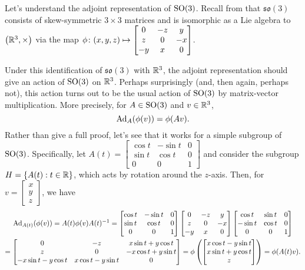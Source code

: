 \begin{example}\label{ex:adjoint action of so3}
	Let's understand the adjoint representation of $\operatorname{SO}(3)$. Recall from  that $\mathfrak{so}(3)$ consists of skew-symmetric $3 \times 3$ matrices and is isomorphic as a Lie algebra to $\left(\mathbb{R}^3, \times \right)$ via the map $\phi \colon\thinspace\! (x,y,z) \mapsto \begin{bmatrix} 0 & -z & y \\ z & 0 & -x \\ -y & x & 0 \end{bmatrix}$.
	
	Under this identification of $\mathfrak{so}(3)$ with $\mathbb{R}^3$, the adjoint representation should give an action of $\operatorname{SO}(3)$ on $\mathbb{R}^3$. Perhaps surprisingly (and, then again, perhaps not), this action turns out to be the usual action of $\operatorname{SO}(3)$ by matrix-vector multiplication. More precisely, for $A \in \operatorname{SO}(3)$ and $v \in \mathbb{R}^3$,
	\[
		\operatorname{Ad}_A(\phi(v)) = \phi(Av).
	\]
	Rather than give a full proof, let's see that it works for a simple subgroup of $\operatorname{SO}(3)$. Specifically, let $A(t) = \begin{bmatrix} \cos t & -\sin t & 0 \\ \sin t & \cos t & 0 \\ 0 & 0 & 1 \end{bmatrix}$ and consider the subgroup $H = \left\{ A(t) : t \in \mathbb{R}\right\}$, which acts by rotation around the $z$-axis. Then, for $v = \begin{bmatrix}x \\ y \\ z \end{bmatrix}$, we have
	\begin{multline*}
		\operatorname{Ad}_{A(t)}(\phi(v)) = A(t) \phi(v) A(t)^{-1} = \begin{bmatrix} \cos t & -\sin t & 0 \\ \sin t & \cos t & 0 \\ 0 & 0 & 1 \end{bmatrix} \begin{bmatrix} 0 & -z & y \\ z & 0 & -x \\ -y & x & 0 \end{bmatrix} \begin{bmatrix} \cos t & \sin t & 0 \\ -\sin t & \cos t & 0 \\ 0 & 0 & 1 \end{bmatrix} \\
		= \begin{bmatrix} 0 & -z & x \sin t + y \cos t \\ z & 0 & -x \cos t + y \sin t \\ -x \sin t - y \cos t & x \cos t - y \sin t & 0 \end{bmatrix} = \phi \left( \begin{bmatrix} x \cos t - y \sin t \\ x \sin t + y \cos t\\ z \end{bmatrix}\right) = \phi(A(t)v).
	\end{multline*}
	

\end{example}
